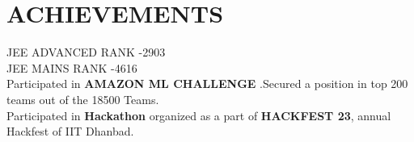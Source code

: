 \section{ACHIEVEMENTS}
    \begin{itemize}[leftmargin=0.15in, label={}]
		\small{\item{
		 {
JEE ADVANCED RANK -2903
}\\{
JEE MAINS RANK -4616
}
		 \\
{Participated in \textbf{AMAZON ML CHALLENGE} .Secured a  position in top 200 teams out of the 18500 Teams.}	\\
{
Participated in \textbf{Hackathon} organized as a part of \textbf{HACKFEST 23}, annual Hackfest of IIT Dhanbad.
}
	}}
    \end{itemize}